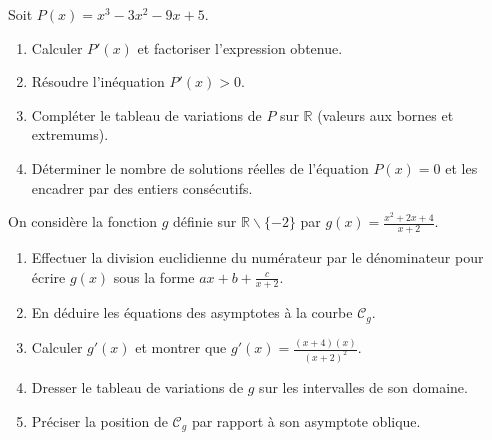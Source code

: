 \documentclass[11pt]{article}
\def\setminus{\mathbin{\backslash}}\let\smallsetminus\setminus
\begin{document}
\begin{exercice}
Soit $P(x) = x^3 - 3x^2 - 9x + 5$.
\begin{enumerate}
    \item Calculer $P'(x)$ et factoriser l'expression obtenue.
    \item Résoudre l'inéquation $P'(x) > 0$.
    \item Compléter le tableau de variations de $P$ sur $\mathbb{R}$ (valeurs aux bornes et extremums).
    \item Déterminer le nombre de solutions réelles de l'équation $P(x) = 0$ et les encadrer par des entiers consécutifs.
\end{enumerate}
\end{exercice}

\begin{exercice}
On considère la fonction $g$ définie sur $\mathbb{R} \setminus \{-2\}$ par $g(x) = \frac{x^2 + 2x + 4}{x+2}$.
\begin{enumerate}
    \item Effectuer la division euclidienne du numérateur par le dénominateur pour écrire $g(x)$ sous la forme $ax + b + \frac{c}{x+2}$.
    \item En déduire les équations des asymptotes à la courbe $\mathcal{C}_g$.
    \item Calculer $g'(x)$ et montrer que $g'(x) = \frac{(x+4)(x)}{(x+2)^2}$.
    \item Dresser le tableau de variations de $g$ sur les intervalles de son domaine.
    \item Préciser la position de $\mathcal{C}_g$ par rapport à son asymptote oblique.
\end{enumerate}
\end{exercice}
\end{document}
